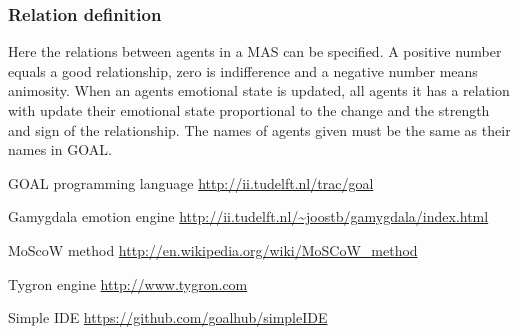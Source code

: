 \documentclass[]{article}
\begin{document}
\subsubsection{Relation definition}
Here the relations between agents in a MAS can be specified. A positive number equals a good relationship, zero is indifference and a negative number means animosity. When an agents emotional state is updated, all agents it has a relation with update their emotional state proportional to the change and the strength and sign of the relationship. The names of agents given must be the same as their names in GOAL.

\clearpage
\printglossaries


\begin{thebibliography}{9}
	
	GOAL programming language
	\url{http://ii.tudelft.nl/trac/goal}
	
	Gamygdala emotion engine
	\url{http://ii.tudelft.nl/~joostb/gamygdala/index.html}
	
	MoScoW method
	\url{http://en.wikipedia.org/wiki/MoSCoW_method }
	
	Tygron engine
	\url{http://www.tygron.com }
	
	Simple IDE
	\url{https://github.com/goalhub/simpleIDE }
	
	
\end{thebibliography}
\end{document}
